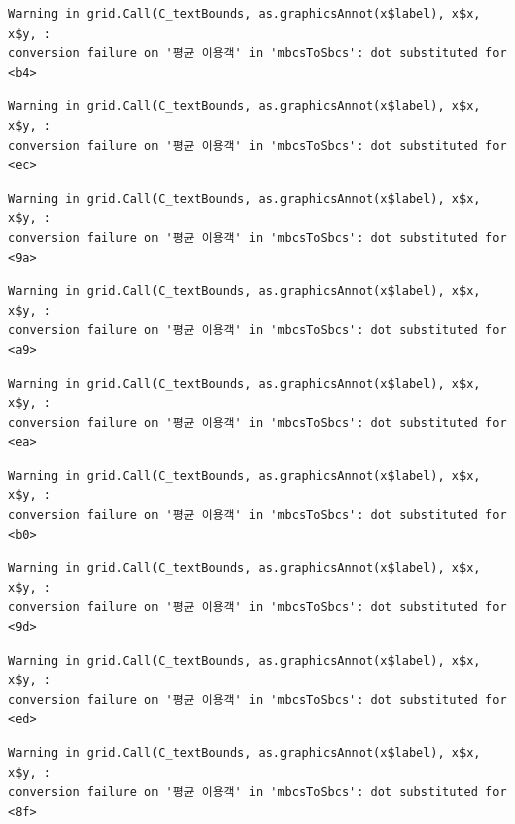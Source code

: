 \documentclass[
  letterpaper,
  DIV=11,
  numbers=noendperiod]{scrreprt}
\begin{document}
\begin{verbatim}
Warning in grid.Call(C_textBounds, as.graphicsAnnot(x$label), x$x, x$y, :
conversion failure on '평균 이용객' in 'mbcsToSbcs': dot substituted for <b4>
\end{verbatim}

\begin{verbatim}
Warning in grid.Call(C_textBounds, as.graphicsAnnot(x$label), x$x, x$y, :
conversion failure on '평균 이용객' in 'mbcsToSbcs': dot substituted for <ec>
\end{verbatim}

\begin{verbatim}
Warning in grid.Call(C_textBounds, as.graphicsAnnot(x$label), x$x, x$y, :
conversion failure on '평균 이용객' in 'mbcsToSbcs': dot substituted for <9a>
\end{verbatim}

\begin{verbatim}
Warning in grid.Call(C_textBounds, as.graphicsAnnot(x$label), x$x, x$y, :
conversion failure on '평균 이용객' in 'mbcsToSbcs': dot substituted for <a9>
\end{verbatim}

\begin{verbatim}
Warning in grid.Call(C_textBounds, as.graphicsAnnot(x$label), x$x, x$y, :
conversion failure on '평균 이용객' in 'mbcsToSbcs': dot substituted for <ea>
\end{verbatim}

\begin{verbatim}
Warning in grid.Call(C_textBounds, as.graphicsAnnot(x$label), x$x, x$y, :
conversion failure on '평균 이용객' in 'mbcsToSbcs': dot substituted for <b0>
\end{verbatim}

\begin{verbatim}
Warning in grid.Call(C_textBounds, as.graphicsAnnot(x$label), x$x, x$y, :
conversion failure on '평균 이용객' in 'mbcsToSbcs': dot substituted for <9d>
\end{verbatim}

\begin{verbatim}
Warning in grid.Call(C_textBounds, as.graphicsAnnot(x$label), x$x, x$y, :
conversion failure on '평균 이용객' in 'mbcsToSbcs': dot substituted for <ed>
\end{verbatim}

\begin{verbatim}
Warning in grid.Call(C_textBounds, as.graphicsAnnot(x$label), x$x, x$y, :
conversion failure on '평균 이용객' in 'mbcsToSbcs': dot substituted for <8f>
\end{verbatim}
\end{document}
